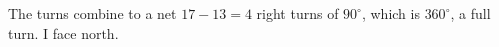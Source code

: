 The turns combine to a net \(17-13=4\) right turns of \(90^\circ\), which is \(360^\circ\), a full turn. I face \(\boxed{\text{north}}\).
